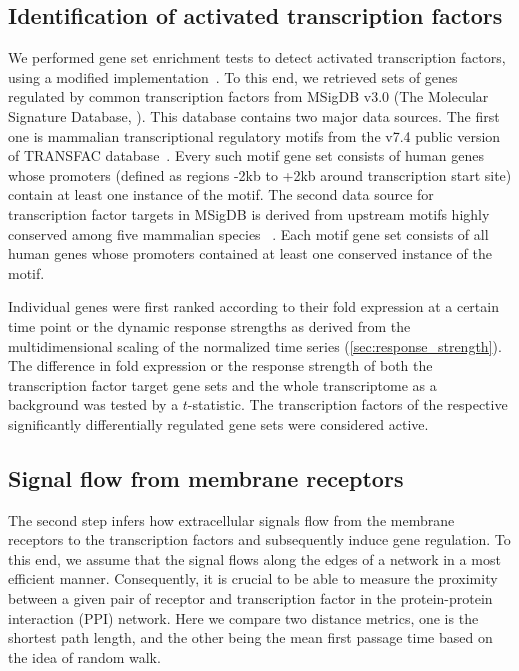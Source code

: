 \subsection{Identification of activated transcription factors}
We performed gene set enrichment tests to detect activated
transcription factors, 
using a modified implementation~\citep{Luo2009}.
To this end, we retrieved sets of genes regulated by 
common transcription factors from MSigDB v3.0 (The Molecular Signature Database, \cite{Liberzon2011}). 
This database contains two major data sources. The first one is mammalian 
transcriptional regulatory motifs from the v7.4 public version of TRANSFAC 
database~\citep{Matys2003b}. Every such motif gene set consists of human 
genes whose promoters (defined as regions -2kb to +2kb around transcription 
start site) contain at least one instance of the motif.
The second data source for transcription factor targets in MSigDB is derived 
from upstream motifs highly conserved among five mammalian species~%
\citep{Xie2005e}. Each motif gene set consists of all human genes whose 
promoters contained at least one conserved instance of the motif.

Individual genes were first ranked according to their fold 
expression at a certain time point or the dynamic response 
strengths as derived from the 
multidimensional scaling of the normalized time series 
(\ref{sec:response_strength}). The difference in fold 
expression or the response strength of both
the transcription factor target gene sets and  
the whole transcriptome as a background was tested by a 
$t$-statistic. 
The transcription factors of the respective significantly differentially regulated
gene sets were considered active.

\subsection{Signal flow from membrane receptors}
The second step infers how extracellular signals flow from the 
membrane receptors to 
the transcription factors and subsequently induce gene regulation. 
To this end, we assume that the signal flows along the edges of a network 
in a most efficient manner. Consequently, it is 
crucial to be able to measure the proximity between a given pair of receptor and
transcription factor in the protein-protein interaction (PPI) 
network. Here we 
compare two distance metrics, one is the shortest path length, and the other
being the mean first passage time based on the idea of random walk.

